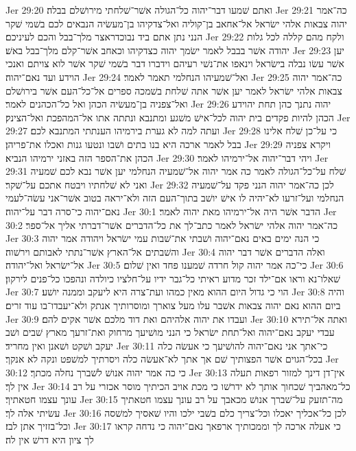 Jer 29:20  ואתם שׁמעו דבר־יהוה כל־הגולה אשׁר־שׁלחתי מירושׁלם בבלה׃
Jer 29:21  כה־אמר יהוה צבאות אלהי ישׂראל אל־אחאב בן־קוליה ואל־צדקיהו בן־מעשׂיה הנבאים לכם בשׁמי שׁקר הנני נתן אתם ביד נבוכדראצר מלך־בבל והכם לעיניכם׃
Jer 29:22  ולקח מהם קללה לכל גלות יהודה אשׁר בבבל לאמר ישׂמך יהוה כצדקיהו וכאחב אשׁר־קלם מלך־בבל באשׁ׃
Jer 29:23  יען אשׁר עשׂו נבלה בישׂראל וינאפו את־נשׁי רעיהם וידברו דבר בשׁמי שׁקר אשׁר לוא צויתם ואנכי הוידע ועד נאם־יהוה׃
Jer 29:24  ואל־שׁמעיהו הנחלמי תאמר לאמר׃
Jer 29:25  כה־אמר יהוה צבאות אלהי ישׂראל לאמר יען אשׁר אתה שׁלחת בשׁמכה ספרים אל־כל־העם אשׁר בירושׁלם ואל־צפניה בן־מעשׂיה הכהן ואל כל־הכהנים לאמר׃
Jer 29:26  יהוה נתנך כהן תחת יהוידע הכהן להיות פקדים בית יהוה לכל־אישׁ משׁגע ומתנבא ונתתה אתו אל־המהפכת ואל־הצינק׃
Jer 29:27  ועתה למה לא גערת בירמיהו הענתתי המתנבא לכם׃
Jer 29:28  כי על־כן שׁלח אלינו בבל לאמר ארכה היא בנו בתים ושׁבו ונטעו גנות ואכלו את־פריהן׃
Jer 29:29  ויקרא צפניה הכהן את־הספר הזה באזני ירמיהו הנביא׃
Jer 29:30  ויהי דבר־יהוה אל־ירמיהו לאמר׃
Jer 29:31  שׁלח על־כל־הגולה לאמר כה אמר יהוה אל־שׁמעיה הנחלמי יען אשׁר נבא לכם שׁמעיה ואני לא שׁלחתיו ויבטח אתכם על־שׁקר׃
Jer 29:32  לכן כה־אמר יהוה הנני פקד על־שׁמעיה הנחלמי ועל־זרעו לא־יהיה לו אישׁ יושׁב בתוך־העם הזה ולא־יראה בטוב אשׁר־אני עשׂה־לעמי נאם־יהוה כי־סרה דבר על־יהוה׃
Jer 30:1  הדבר אשׁר היה אל־ירמיהו מאת יהוה לאמר׃
Jer 30:2  כה־אמר יהוה אלהי ישׂראל לאמר כתב־לך את כל־הדברים אשׁר־דברתי אליך אל־ספר׃
Jer 30:3  כי הנה ימים באים נאם־יהוה ושׁבתי את־שׁבות עמי ישׂראל ויהודה אמר יהוה והשׁבתים אל־הארץ אשׁר־נתתי לאבותם וירשׁוה׃
Jer 30:4  ואלה הדברים אשׁר דבר יהוה אל־ישׂראל ואל־יהודה׃
Jer 30:5  כי־כה אמר יהוה קול חרדה שׁמענו פחד ואין שׁלום׃
Jer 30:6  שׁאלו־נא וראו אם־ילד זכר מדוע ראיתי כל־גבר ידיו על־חלציו כיולדה ונהפכו כל־פנים לירקון׃
Jer 30:7  הוי כי גדול היום ההוא מאין כמהו ועת־צרה היא ליעקב וממנה יושׁע׃
Jer 30:8  והיה ביום ההוא נאם יהוה צבאות אשׁבר עלו מעל צוארך ומוסרותיך אנתק ולא־יעבדו־בו עוד זרים׃
Jer 30:9  ועבדו את יהוה אלהיהם ואת דוד מלכם אשׁר אקים להם׃
Jer 30:10  ואתה אל־תירא עבדי יעקב נאם־יהוה ואל־תחת ישׂראל כי הנני מושׁיעך מרחוק ואת־זרעך מארץ שׁבים ושׁב יעקב ושׁקט ושׁאנן ואין מחריד׃
Jer 30:11  כי־אתך אני נאם־יהוה להושׁיעך כי אעשׂה כלה בכל־הגוים אשׁר הפצותיך שׁם אך אתך לא־אעשׂה כלה ויסרתיך למשׁפט ונקה לא אנקך׃
Jer 30:12  כי כה אמר יהוה אנושׁ לשׁברך נחלה מכתך׃
Jer 30:13  אין־דן דינך למזור רפאות תעלה אין לך׃
Jer 30:14  כל־מאהביך שׁכחוך אותך לא ידרשׁו כי מכת אויב הכיתיך מוסר אכזרי על רב עונך עצמו חטאתיך׃
Jer 30:15  מה־תזעק על־שׁברך אנושׁ מכאבך על רב עונך עצמו חטאתיך עשׂיתי אלה לך׃
Jer 30:16  לכן כל־אכליך יאכלו וכל־צריך כלם בשׁבי ילכו והיו שׁאסיך למשׁסה וכל־בזזיך אתן לבז׃
Jer 30:17  כי אעלה ארכה לך וממכותיך ארפאך נאם־יהוה כי נדחה קראו לך ציון היא דרשׁ אין לה׃
